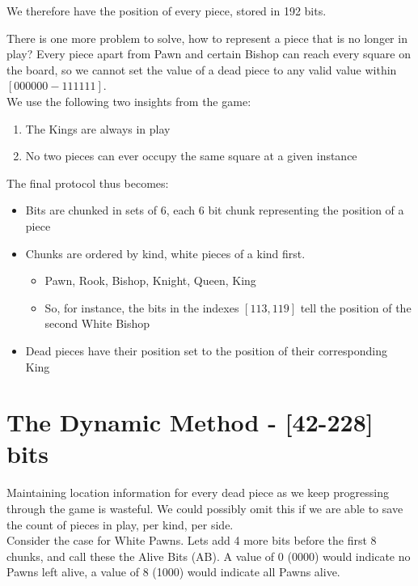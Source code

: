 \documentclass{article}
\begin{document}
We therefore have the position of every piece, stored in 192 bits.

There is one more problem to solve, how to represent a piece that is no longer in play? Every piece apart from Pawn and certain Bishop can reach every square on the board, so we cannot set the value of a dead piece to any valid value within $[000000-111111]$.\\

We use the following two insights from the game:
\begin{enumerate}
    \item The Kings are always in play
    \item No two pieces can ever occupy the same square at a given instance
\end{enumerate}


The final protocol thus becomes:
\begin{itemize}
\item Bits are chunked in sets of 6, each 6 bit chunk representing the position of a piece
\item Chunks are ordered by kind, white pieces of a kind first.
    \begin{itemize}
        \item Pawn, Rook, Bishop, Knight, Queen, King
        \item So, for instance, the bits in the indexes $[113, 119]$ tell the position of the second White Bishop
    \end{itemize}
\item Dead pieces have their position set to the position of their corresponding King
\end{itemize}

\newpage

\section{The Dynamic Method - [42-228] bits}
Maintaining location information for every dead piece as we keep progressing through the game is wasteful. We could possibly omit this if we are able to save the count of pieces in play, per kind, per side. \\

Consider the case for White Pawns. Lets add 4 more bits before the first 8 chunks, and call these the Alive Bits (AB). A value of 0 (0000) would indicate no Pawns left alive, a value of 8 (1000) would indicate all Pawns alive.\\
\end{document}
